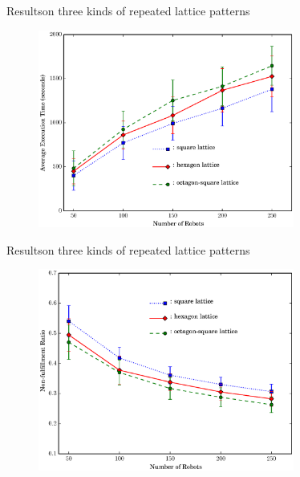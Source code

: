 \documentclass[10pt]{beamer}
\begin{document}
\begin{frame}{Results}{on three kinds of repeated
lattice patterns}

\begin{figure}
  \centering
  \includegraphics[width=0.75\textwidth]{figs/exptime}
\end{figure}

\end{frame}
\begin{frame}{Results}{on three kinds of repeated
lattice patterns}

\begin{figure}
  \centering
  \includegraphics[width=0.75\textwidth]{figs/expqual}
\end{figure}
\end{frame}
\end{document}

